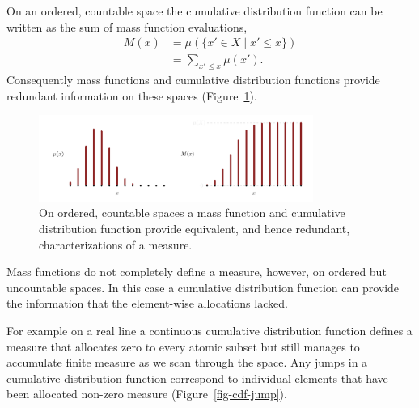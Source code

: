 \documentclass[
  letterpaper,
  DIV=11,
  numbers=noendperiod]{scrartcl}
\begin{document}
On an ordered, countable space the cumulative distribution function can
be written as the sum of mass function evaluations, \begin{align*}
M(x)
&= \mu(\{ x' \in X \mid x' \le x \})
\\
&= \sum_{x' \le x} \mu(x').
\end{align*} Consequently mass functions and cumulative distribution
functions provide redundant information on these spaces
(Figure~\ref{fig-discrete-cdf}).

\begin{figure}

{\centering \includegraphics[width=0.8\textwidth,height=\textheight]{figures/cdfs/discrete_cdf/discrete_cdf.pdf}

}

\caption{\label{fig-discrete-cdf}On ordered, countable spaces a mass
function and cumulative distribution function provide equivalent, and
hence redundant, characterizations of a measure.}

\end{figure}

Mass functions do not completely define a measure, however, on ordered
but uncountable spaces. In this case a cumulative distribution function
can provide the information that the element-wise allocations lacked.

For example on a real line a continuous cumulative distribution function
defines a measure that allocates zero to every atomic subset but still
manages to accumulate finite measure as we scan through the space. Any
jumps in a cumulative distribution function correspond to individual
elements that have been allocated non-zero measure
(Figure~\ref{fig-cdf-jump}).
\end{document}
